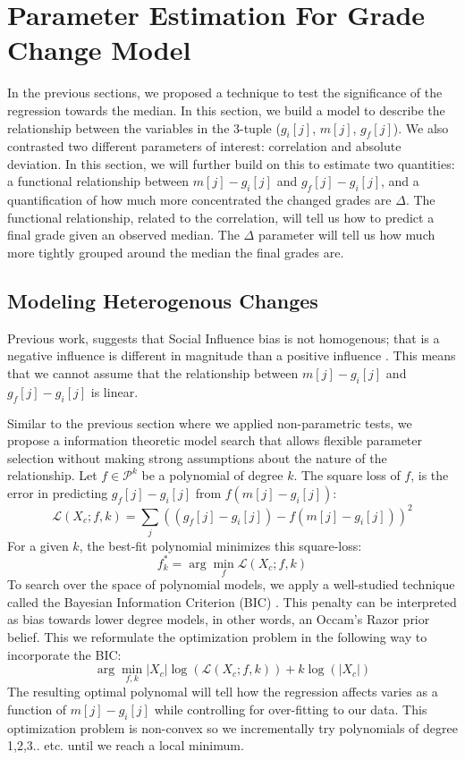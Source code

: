 \section{Parameter Estimation For Grade Change Model}
In the previous sections, we proposed a technique to test the significance of the regression towards the median.
In this section, we build a model to describe the relationship between the variables in the 3-tuple ($g_i[j]$, $m[j]$, $g_f[j]$).
We also contrasted two different parameters of interest: correlation and absolute deviation.
In this section, we will further build on this to estimate two quantities: a functional relationship between $m[j] - g_i[j]$ and $g_f[j] - g_i[j]$, and a quantification of how much more concentrated the changed grades are $\Delta$.
The functional relationship, related to the correlation, will tell us how to predict a final grade given an observed median.
The $\Delta$ parameter will tell us how much more tightly grouped around the median the final grades are.

\subsection{Modeling Heterogenous Changes}
Previous work, suggests that Social Influence bias is not homogenous; that is a negative influence is different in magnitude than a positive influence \cite{???}.
This means that we cannot assume that the relationship between $m[j] - g_i[j]$ and $g_f[j] - g_i[j]$ is linear.

Similar to the previous section where we applied non-parametric tests, we propose a information theoretic model search that allows flexible parameter selection without making strong assumptions about the nature of the relationship.
Let $f\in \mathcal{P}^k$ be a polynomial of degree $k$.
The square loss of $f$, is the error in predicting $g_f[j] - g_i[j]$ from $f(m[j] - g_i[j])$:
\begin{equation}
\mathcal{L}(X_c;f,k) = \sum_j ((g_f[j] - g_i[j]) - f(m[j] - g_i[j]))^2 
\end{equation}
For a given $k$, the best-fit polynomial minimizes this square-loss:
\begin{equation}
f^*_k =\arg \min_f \mathcal{L}(X_c;f,k)
\end{equation}
To search over the space of polynomial models, we apply a well-studied technique called the Bayesian Information Criterion (BIC) \cite{???}.
This penalty can be interpreted as bias towards lower degree models, in other words, an Occam's Razor prior belief. 
This we reformulate the optimization problem in the following way to incorporate the BIC:
\begin{equation}
\arg \min_{f,k} |X_c|\log(\mathcal{L}(X_c;f,k)) + k\log(|X_c|)
\end{equation}
The resulting optimal polynomal will tell how the regression affects varies as a function of $m[j] - g_i[j]$ while controlling for over-fitting to our data.
This optimization problem is non-convex so we incrementally try polynomials of degree 1,2,3.. etc. until we reach a local minimum.

